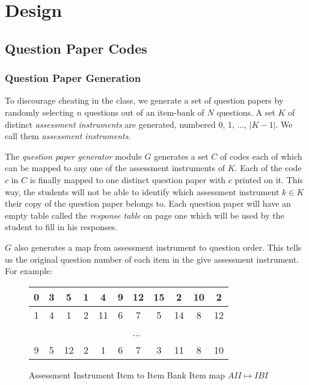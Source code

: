 \documentclass[12pt]{report}
\begin{document}
\chapter{Design}
\section{Question Paper Codes}

\subsection{Question Paper Generation}
To discourage cheating in the class, we generate a set of question papers by randomly selecting $n$ questions out of an item-bank of $N$ questions. A set $K$ of distinct \emph{assessment instruments} are generated, numbered 0, 1, ..., $|K-1|$. We call them \emph{assessment instruments}.

The \emph{question paper generator} module $G$ generates a set $C$ of codes each of which can be mapped to any one of the assessment instruments of $K$. Each of the code $c$ in $C$ is finally mapped to one distinct question paper with $c$ printed on it. This way, the students will not be able to identify which assessment instrument $k \in K$ their copy of the question paper belongs to. Each question paper will have an empty table called the \emph{response table} on page one which will be used by the student to fill in his responses.

$G$ also generates a map from assessment instrument to question order. This tells us the original question number of each item in the give assessment instrument. For example:
\begin{figure}

\begin{center}
\begin{tabular}{|c|c|c|c|c|c|c|c|c|c|c|}
\hline
\cellcolor{Gray}0 & 3 & 5 & 1 & 4 & 9 & 12 & 15 & 2 & 10 & 2 \\
\hline
\cellcolor{Gray}1 & 4 & 1 & 2 & 11 & 6 & 7 & 5 & 14 & 8 & 12 \\
\hline
& \multicolumn{10}{|c|}{...} \\
\hline
\cellcolor{Gray}9 & 5 & 12 & 2 & 1 & 6 & 7 & 3 & 11 & 8 & 10 \\
\hline
\end{tabular}
\end{center}

\caption{Assessment Instrument Item to Item Bank Item map $AII \mapsto IBI$}
\label{f:aiiibi} 
\end{figure}
\end{document}
